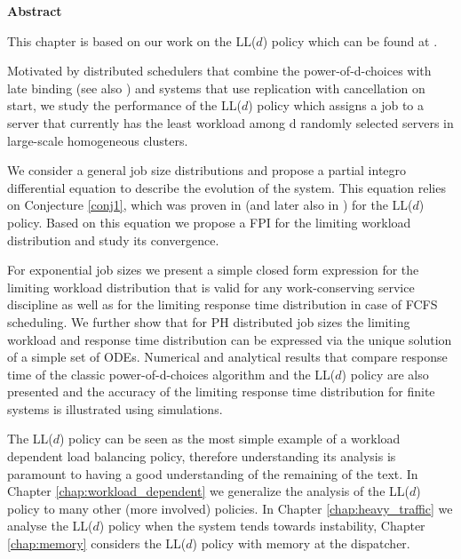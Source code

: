 \documentclass[12pt]{report}
\newenvironment{chapabstract}{%
    \begin{center}%
      \bfseries Abstract
    \end{center}}%
   {\par}
\begin{document}
\begin{chapabstract}
This chapter is based on our work on the LL($d$) policy which can be found at \cite{hellemans2018power}.

Motivated by distributed schedulers that combine the power-of-d-choices with late binding (see also \cite{ousterhout2013sparrow}) and systems that use replication with cancellation on start, we study the performance of the LL($d$) policy which assigns a job to a server that currently has the least workload among d randomly selected servers in large-scale homogeneous clusters.

We consider a general job size distributions and propose a partial integro differential equation to describe the evolution of the system. This equation relies on Conjecture \ref{conj1}, which was proven in \cite{bramson2012asymptotic} (and later also in \cite{shneer2020large}) for the LL($d$) policy. Based on this equation we propose a FPI for the limiting workload distribution and study its convergence.

For exponential job sizes we present a simple closed form expression for the limiting workload distribution that is valid for any work-conserving 
service discipline as well as for the limiting response time distribution in case of FCFS scheduling.
We further show that for PH distributed job sizes the limiting workload and response time distribution can be expressed via 
the unique solution of a simple set of ODEs. Numerical and analytical results that compare response time of the classic power-of-d-choices algorithm and the LL($d$) policy are also presented
and the accuracy of the limiting response time distribution for finite systems is illustrated using simulations.

The LL($d$) policy can be seen as the most simple example of a workload dependent load balancing policy, therefore understanding its analysis is paramount to having a good understanding of the remaining of the text. In Chapter \ref{chap:workload_dependent} we generalize the analysis of the LL($d$) policy to many other (more involved) policies. In Chapter \ref{chap:heavy_traffic} we analyse the LL($d$) policy when the system tends towards instability, Chapter \ref{chap:memory} considers the LL($d$) policy with memory at the dispatcher.
\end{chapabstract}
\end{document}
